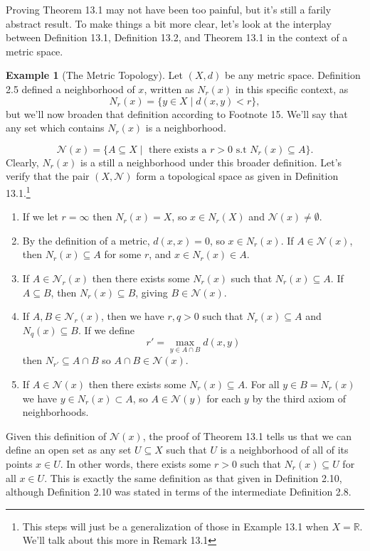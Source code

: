\documentclass{article}
\newcommand{\R}{\mathbb{R}}
\theoremstyle{definition}
\newtheorem{example}{Example}[section]
\begin{document}
	Proving Theorem 13.1 may not have been too painful, but it's still a farily abstract result. To make things a bit more clear, let's look at the interplay between Definition 13.1, Definition 13.2, and Theorem 13.1 in the context of a metric space.
	
	\begin{example}[The Metric Topology]
		Let $(X,d)$ be any metric space. Definition 2.5 defined a neighborhood of $x$, written as $N_r(x)$ in this specific context, as $$N_r(x)=\{y\in X\mid d(x,y)<r\},$$ but we'll now broaden that definition according to Footnote 15. We'll say that any set which contains $N_r(x)$ is a neighborhood. 
		
		
		$$ \mathcal N(x) = \{A\subseteq X\mid \text{ there exists a }r>0\text{ s.t }N_r(x)\subseteq A \}.$$ Clearly, $N_r(x)$ is a still a neighborhood under this broader definition. Let's verify that the pair $(X,\mathcal N)$ form a topological space as given in Definition 13.1.\footnote{This steps will just be a generalization of those in Example 13.1 when $X=\R$. We'll talk about this more in Remark 13.1}
		\begin{enumerate}
			\item If we let $r=\infty$ then $N_r(x)=X$, so $x\in N_r(X)$ and $\mathcal N(x)\neq\emptyset$.
			\item By the definition of a metric, $d(x,x)=0$, so $x\in N_r(x)$. If $A\in\mathcal N(x)$, then $N_r(x)\subseteq A$ for some $r$, and $x\in N_r(x)\in A$.
			\item If $A\in\mathcal N_r(x)$ then there exists some $N_r(x)$ such that $N_r(x)\subseteq A$. If $A\subseteq B$, then $N_r(x)\subseteq B$, giving $B\in\mathcal N(x)$.
			\item If $A,B\in\mathcal N_r(x)$, then we have $r,q>0$ such that $N_r(x)\subseteq A$ and $N_q(x)\subseteq B$. If we define $$ r' = \max_{y\in A\cap B}d(x,y)$$ then $N_{r'}\subseteq A\cap B$ so $A\cap B\in\mathcal N(x)$.
			\item If $A\in \mathcal N(x)$ then there exists some $N_r(x)\subseteq A$. For all $y\in B=N_r(x)$ we have $y\in N_r(x)\subset A$, so $A\in \mathcal N(y)$ for each $y$ by the third axiom of neighborhoods.
		\end{enumerate}
	
	Given this definition of $\mathcal N(x)$, the proof of Theorem 13.1 tells us that we can define an open set as any set $U\subseteq X$ such that $U$ is a neighborhood of all of its points $x\in U$. In other words, there exists some $r>0$ such that $N_r(x)\subseteq U$ for all $x\in U$. This is exactly the same definition as that given in Definition 2.10, although Definition 2.10 was stated in terms of the intermediate Definition 2.8. 
	\end{example}
\end{document}
